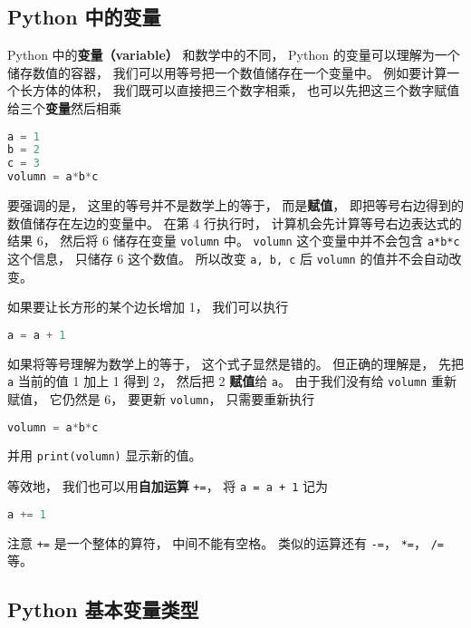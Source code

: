 
\begin{issues}
\issueDraft
\end{issues}

\subsection{Python 中的变量}
Python 中的\textbf{变量（variable）} 和数学中的不同， Python 的变量可以理解为一个储存数值的容器， 我们可以用等号把一个数值储存在一个变量中。 例如要计算一个长方体的体积， 我们既可以直接把三个数字相乘， 也可以先把这三个数字赋值给三个\textbf{变量}然后相乘
\begin{lstlisting}[language=python]
a = 1
b = 2
c = 3
volumn = a*b*c
\end{lstlisting}

要强调的是， 这里的等号并不是数学上的等于， 而是\textbf{赋值}， 即把等号右边得到的数值储存在左边的变量中。 在第 4 行执行时， 计算机会先计算等号右边表达式的结果 6， 然后将 6 储存在变量 \verb|volumn| 中。 \verb|volumn| 这个变量中并不会包含 \verb|a*b*c| 这个信息， 只储存 6 这个数值。 所以改变 \verb|a, b, c| 后 \verb|volumn| 的值并不会自动改变。

如果要让长方形的某个边长增加 1， 我们可以执行
\begin{lstlisting}[language=python]
a = a + 1
\end{lstlisting}
如果将等号理解为数学上的等于， 这个式子显然是错的。 但正确的理解是， 先把 \verb|a| 当前的值 1 加上 1 得到 2， 然后把 2 \textbf{赋值}给 \verb|a|。 由于我们没有给 \verb|volumn| 重新赋值， 它仍然是 6， 要更新 \verb|volumn|， 只需要重新执行
\begin{lstlisting}[language=python]
volumn = a*b*c
\end{lstlisting}
并用 \verb|print(volumn)| 显示新的值。

等效地， 我们也可以用\textbf{自加运算} \verb|+=|， 将 \verb|a = a + 1| 记为
\begin{lstlisting}[language=python]
a += 1
\end{lstlisting}
注意 \verb|+=| 是一个整体的算符， 中间不能有空格。 类似的运算还有 \verb|-=|， \verb|*=|， \verb|/=| 等。

\subsection{Python 基本变量类型}

